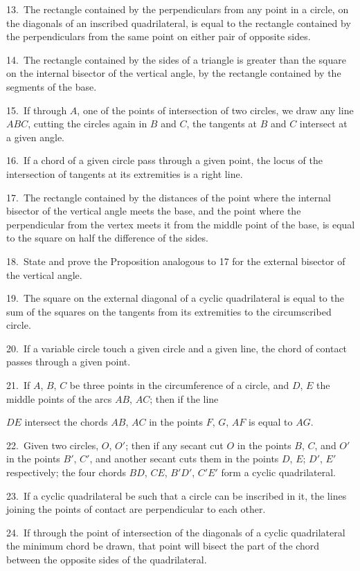 \documentclass[oneside]{book}
\begin{document}
\begin{footnotesize}
13.~The rectangle contained by the perpendiculars from any
point in a circle, on the diagonals of an inscribed quadrilateral, is
equal to the rectangle contained by the perpendiculars from the
same point on either pair of opposite sides.

14.~The rectangle contained by the sides of a triangle is
greater than the square on the internal bisector of the vertical
angle, by the rectangle contained by the segments of the base.

15.~If through $A$, one of the points of intersection of two
circles, we draw any line $ABC$, cutting the circles again in
$B$ and $C$, the tangents at $B$ and $C$ intersect at a given angle.

16.~If a chord of a given circle pass through a given point, the
locus of the intersection of tangents at its extremities is a right
line.

17.~The rectangle contained by the distances of the point where
the internal bisector of the vertical angle meets the base, and the
point where the perpendicular from the vertex meets it from the
middle point of the base, is equal to the square on half the difference
of the sides.

18.~State and prove the Proposition analogous to 17 for the
external bisector of the vertical angle.

19.~The square on the external diagonal of a cyclic quadrilateral
is equal to the sum of the squares on the tangents from
its extremities to the circumscribed circle.

20.~If a variable circle touch a given circle and a given line,
the chord of contact passes through a given point.

21.~If $A$, $B$, $C$ be three points in the circumference of a circle,
and $D$, $E$ the middle points of the arcs $AB$, $AC$; \label{theifthen}then if the line

$DE$ intersect the chords $AB$, $AC$ in the points $F$, $G$, $AF$ is equal
to $AG$.

22.~Given two circles, $O$, $O'$; then if any secant cut $O$ in the
points $B$, $C$, and $O'$ in the points $B'$, $C'$, and another secant cuts
them in the points $D$, $E$; $D'$, $E'$ respectively; the four chords
$BD$, $CE$, $B'D'$, $C'E'$ form a cyclic quadrilateral.

23.~If a cyclic quadrilateral be such that a circle can be
inscribed in it, the lines joining the points of contact are perpendicular
to each other.

24.~If through the point of intersection of the diagonals of a
cyclic quadrilateral the minimum chord be drawn, that point will
bisect the part of the chord between the opposite sides of the
quadrilateral.



\end{footnotesize}
\end{document}
